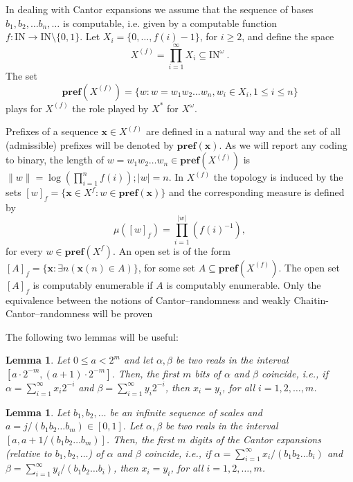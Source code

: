 \documentclass[11pt,a4paper,twoside]{article}
\def \pref#1{{\mathbf{pref}({#1})}}
\newcommand{\x}{{\mathbf x}}
\def \bbbn {\mathrm{I\!N}} %
\def \XF  {X^{(f)}}
\newtheorem{lem}[theo]{Lemma}
\begin{document}
In dealing with  Cantor expansions we  assume that the sequence of bases
$b_1, b_2, \ldots b_n, \ldots$ is computable, i.e.  given by a computable
function  $f:\bbbn\to \bbbn\setminus\{0,1\}$. Let  $X_i=\{0,\dots,
f(i)-1\}$, for
$i\ge 2$,  and define the space $$X^{(f)} = \prod_{i=1}^\infty X_i\subseteq
\bbbn^\omega\ .$$
The set
$$\pref {X^{(f)}} = \{ w : w = w_1 w_2 \ldots w_n, w_i \in X_i, 1 \le i \le
n\}$$
plays for $X^{(f)}$ the role played by $X^*$ for $X^{\omega}$.

Prefixes of a sequence $\x \in X^{(f)}$  are defined in a natural way and
the set of all (admissible) prefixes  will be denoted by $\pref{\x}$.  As we
will report any coding to binary, the length of $w= w_1 w_2 \ldots w_n\in
\pref {X^{(f)}}$ is
$\parallel w \parallel = \log (\prod_{i=1}^{n} f(i)); |w| =n$. In $X^{(f)}$
the topology is induced by the
sets $[w]_{f} = \{\x \in
X^{f} : w\in\pref{\x} \}$ and the corresponding measure is defined by
$$\mu([w]_{f})
= \prod_{i=1}^{|w|} (f(i)^{-1}),$$ for every $w \in \pref{X^{f}}$.
An open set is of the form $[A]_f = \{\x : \exists n (\x(n)\in A)\}$, for some set
$A\subseteq
\pref{\XF}$. The open set $[A]_f$ is computably enumerable if $A$ is
computably enumerable.
Only the equivalence between the notions of Cantor--randomness
and
weakly Chaitin-Cantor--randomness will be proven

The following two lemmas will be useful:

\begin{lem}
\label{binapprox}
Let $0 \le a < 2^{m}$ and let $\alpha, \beta$ be two reals in the interval
$[a\cdot 2^{-m}, (a+1)\cdot 2^{-m}]$. Then, the first $m$ bits of $\alpha$
and $\beta$ coincide, i.e., if $\alpha = \sum_{i=1}^{\infty} x_{i}2^{-i}$
and $\beta = \sum_{i=1}^{\infty} y_{i}2^{-i}$, then $x_{i}=y_{i}$, for all
$i =1,2, \ldots ,m$.
\end{lem}


\begin{lem}
\label{cantorapprox}
Let $b_{1}, b_{2}, \ldots$ be an infinite sequence of scales
and $a= j/(b_{1}b_{2}\ldots b_{m})\in [0,1]. $  Let $\alpha, \beta$ be two reals in the interval
$[a, a + 1/(b_{1}b_{2}\ldots b_{m})]$. Then, the first $m$ digits of the
Cantor expansions (relative to $b_{1}, b_{2}, \ldots$) of $\alpha$ and
$\beta$ coincide, i.e., if $\alpha = \sum_{i=1}^{\infty}
x_{i}/(b_{1}b_{2}\ldots b_{i})$
and $\beta = \sum_{i=1}^{\infty} y_{i}/(b_{1}b_{2}\ldots b_{i})$, then
$x_{i}=y_{i}$, for all $i =1,2, \ldots ,m$.
\end{lem}
\end{document}
